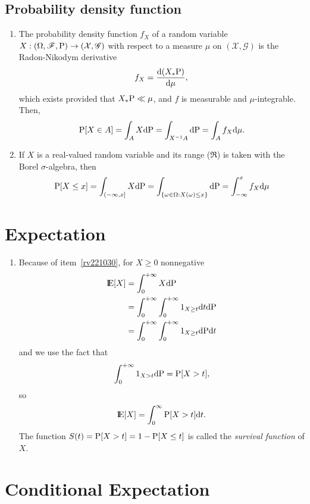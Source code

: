 \documentclass[a4paper,10pt]{article}
\begin{document}
\subsection{Probability density function}
\begin{enumerate}
 \item 
    The probability density function $f_X$ of a random variable $X:(\Omega,\mathscr{F},\mathrm{P})\to (\mathcal{X},\mathscr{G})$
    with respect to a measure $\mu$ on $(\mathcal{X},\mathscr{G})$ is the Radon-Nikodym derivative
    \[
     f_X = \frac{\mathrm{d} (X_*\mathrm{P})}{\mathrm{d} \mu},
    \]
    which exists provided that $X_*\mathrm{P} \ll \mu$, and $f$ is measurable and $\mu$-integrable. Then,
    \begin{align*}
     \mathrm{P}[X\in A] = \int_A X \mathrm{d} \mathrm{P}
                   = \int_{X^{-1}A}\mathrm{d} \mathrm{P}
                   = \int_A f_X \mathrm{d} \mu.
    \end{align*}
  \item If $X$ is a real-valued random variable and its range ($\Re$) is taken with the 
        Borel $\sigma$-algebra, then 
        \begin{align*}
         \mathrm{P}[X\leq x] = \int_{(-\infty, x]}X\mathrm{d} \mathrm{P}
         = \int_{\{\omega\in\Omega: X(\omega) \leq x\}}\mathrm{d} \mathrm{P}
         = \int_{-\infty}^x f_X\mathrm{d} \mu
        \end{align*}

 
\end{enumerate}


\section{Expectation}
\begin{enumerate}  
 \item 
 \label{gx1312}
 Because of item~\ref{rv221030}, for $X\geq 0$ nonnegative 
 \begin{align*}
  \E[X] &= \int_{0}^{+\infty} X \d \prob\\
        &= \int_{0}^{+\infty} \int_0^{+\infty} 1_{X\geq t}\d t \d \prob\\
        &= \int_{0}^{+\infty} \int_0^{+\infty} 1_{X\geq t} \d \prob \d t
 \end{align*}
 and we use the fact that 
 \[
  \int_{0}^{+\infty} 1_{X>t}\mathrm{d} \mathrm{P} = \mathrm{P}[X>t],
 \]
 so
\[
 \E[X] = \int_0^\infty \prob[X>t]\d t.
\]
The function $S(t) = \mathrm{P}[X>t] = 1-\mathrm{P}[X\leq t]$ is called the \textit{survival function} 
of $X$.
\end{enumerate}


\section{Conditional Expectation}
\end{document}
